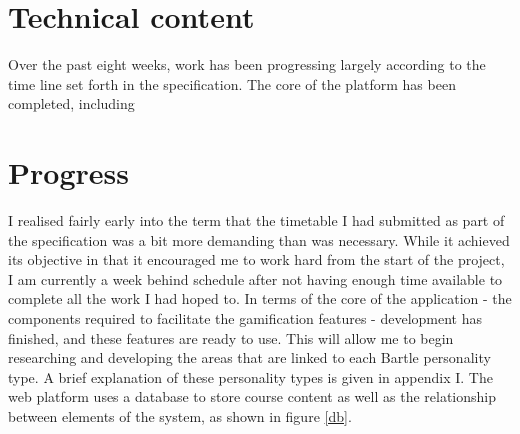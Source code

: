 \documentclass[10pt,a4paper]{report}
\begin{document}
\section*{Technical content}
Over the past eight weeks, work has been progressing largely according to the time line set forth in the specification. The core of the platform has been completed, including 
\section*{Progress}
I realised fairly early into the term that the timetable I had submitted as part of the specification was a bit more demanding than was necessary. While it achieved its objective in that it encouraged me to work hard from the start of the project, I am currently a week behind schedule after not having enough time available to complete all the work I had hoped to. In terms of the core of the application - the components required to facilitate the gamification features - development has finished, and these features are ready to use. This will allow me to begin researching and developing the areas that are linked to each Bartle personality type. A brief explanation of these personality types is given in appendix I. The web platform uses a database to store course content as well as the relationship between elements of the system, as shown in figure \ref{db}.
\end{document}
